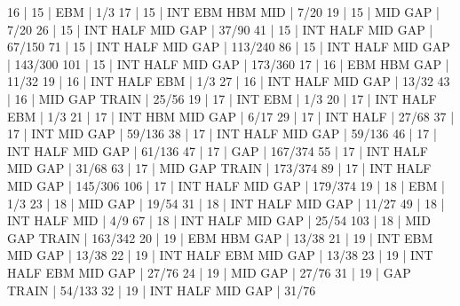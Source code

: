 16    |  15    |                   EBM                        | 1/3   
17    |  15    |        INT        EBM  HBM  MID              | 7/20   
19    |  15    |                             MID  GAP         | 7/20   
26    |  15    |        INT  HALF            MID  GAP         | 37/90   
41    |  15    |        INT  HALF            MID  GAP         | 67/150   
71    |  15    |        INT  HALF            MID  GAP         | 113/240   
86    |  15    |        INT  HALF            MID  GAP         | 143/300   
101   |  15    |        INT  HALF            MID  GAP         | 173/360   
17    |  16    |                   EBM  HBM       GAP         | 11/32   
19    |  16    |        INT  HALF  EBM                        | 1/3   
27    |  16    |        INT  HALF            MID  GAP         | 13/32   
43    |  16    |                             MID  GAP  TRAIN  | 25/56   
19    |  17    |        INT        EBM                        | 1/3   
20    |  17    |        INT  HALF  EBM                        | 1/3   
21    |  17    |        INT             HBM  MID  GAP         | 6/17   
29    |  17    |        INT  HALF                             | 27/68   
37    |  17    |        INT                  MID  GAP         | 59/136   
38    |  17    |        INT  HALF            MID  GAP         | 59/136   
46    |  17    |        INT  HALF            MID  GAP         | 61/136   
47    |  17    |                                  GAP         | 167/374   
55    |  17    |        INT  HALF            MID  GAP         | 31/68   
63    |  17    |                             MID  GAP  TRAIN  | 173/374   
89    |  17    |        INT  HALF            MID  GAP         | 145/306   
106   |  17    |        INT  HALF            MID  GAP         | 179/374   
19    |  18    |                   EBM                        | 1/3   
23    |  18    |                             MID  GAP         | 19/54   
31    |  18    |        INT  HALF            MID  GAP         | 11/27   
49    |  18    |        INT  HALF            MID              | 4/9   
67    |  18    |        INT  HALF            MID  GAP         | 25/54   
103   |  18    |                             MID  GAP  TRAIN  | 163/342   
20    |  19    |                   EBM  HBM       GAP         | 13/38   
21    |  19    |        INT        EBM       MID  GAP         | 13/38   
22    |  19    |        INT  HALF  EBM       MID  GAP         | 13/38   
23    |  19    |        INT  HALF  EBM       MID  GAP         | 27/76   
24    |  19    |                             MID  GAP         | 27/76   
31    |  19    |                                  GAP  TRAIN  | 54/133   
32    |  19    |        INT  HALF            MID  GAP         | 31/76